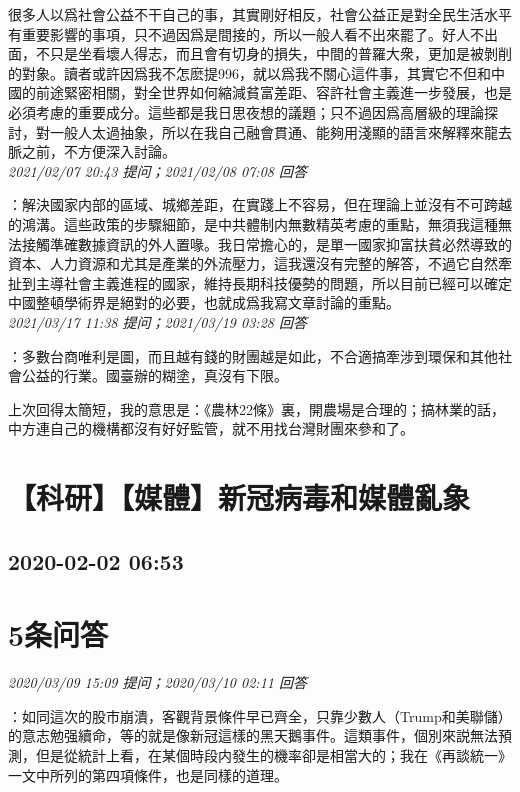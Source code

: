 \documentclass[twocolumn]{ctexart}
\begin{document}
很多人以爲社會公益不干自己的事，其實剛好相反，社會公益正是對全民生活水平有重要影響的事項，只不過因爲是間接的，所以一般人看不出來罷了。好人不出面，不只是坐看壞人得志，而且會有切身的損失，中間的普羅大衆，更加是被剝削的對象。讀者或許因爲我不怎麽提996，就以爲我不關心這件事，其實它不但和中國的前途緊密相關，對全世界如何縮減貧富差距、容許社會主義進一步發展，也是必須考慮的重要成分。這些都是我日思夜想的議題；只不過因爲高層級的理論探討，對一般人太過抽象，所以在我自己融會貫通、能夠用淺顯的語言來解釋來龍去脈之前，不方便深入討論。
\\

\textit{\hfill\noindent\small 2021/02/07 20:43 提问；2021/02/08 07:08 回答}

：解決國家内部的區域、城鄉差距，在實踐上不容易，但在理論上並沒有不可跨越的鴻溝。這些政策的步驟細節，是中共體制内無數精英考慮的重點，無須我這種無法接觸準確數據資訊的外人置喙。我日常擔心的，是單一國家抑富扶貧必然導致的資本、人力資源和尤其是產業的外流壓力，這我還沒有完整的解答，不過它自然牽扯到主導社會主義進程的國家，維持長期科技優勢的問題，所以目前已經可以確定中國整頓學術界是絕對的必要，也就成爲我寫文章討論的重點。
\\

\textit{\hfill\noindent\small 2021/03/17 11:38 提问；2021/03/19 03:28 回答}

：多數台商唯利是圖，而且越有錢的財團越是如此，不合適搞牽涉到環保和其他社會公益的行業。國臺辦的糊塗，真沒有下限。

上次回得太簡短，我的意思是：《農林22條》裏，開農場是合理的；搞林業的話，中方連自己的機構都沒有好好監管，就不用找台灣財團來參和了。
\\


\section{【科研】【媒體】新冠病毒和媒體亂象}
\subsection{2020-02-02 06:53}


\section{5条问答}

\textit{\hfill\noindent\small 2020/03/09 15:09 提问；2020/03/10 02:11 回答}

：如同這次的股市崩潰，客觀背景條件早已齊全，只靠少數人（Trump和美聯儲）的意志勉强續命，等的就是像新冠這樣的黑天鵝事件。這類事件，個別來説無法預測，但是從統計上看，在某個時段内發生的機率卻是相當大的；我在《再談統一》一文中所列的第四項條件，也是同樣的道理。
\end{document}
